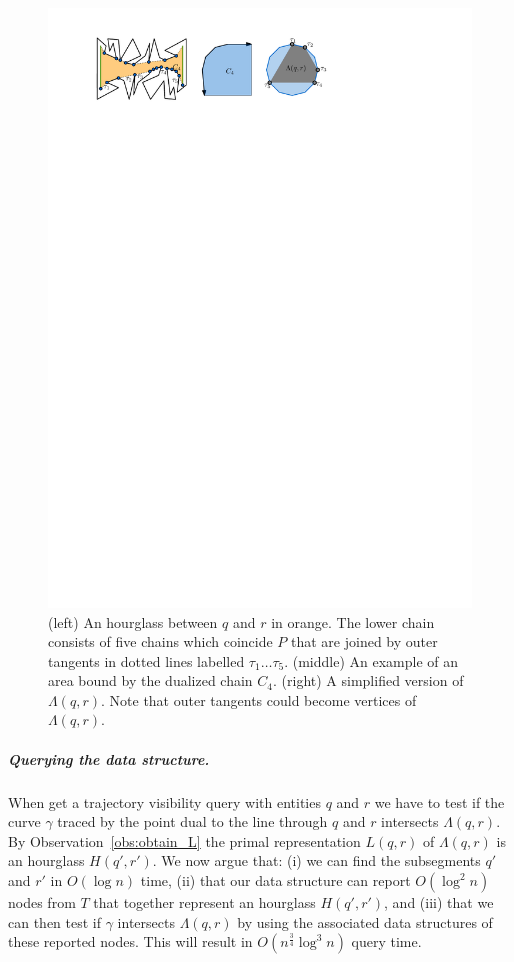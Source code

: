 \documentclass[UKenglish]{lipics-v2019}
\newcommand{\myremark}[4]{\textcolor{blue}{\textsc{#1 #2:}} \textcolor{#4}{\textsf{#3}}}
\newcommand{\frank}[2][says]{\myremark{Frank}{#1}{#2}{SeaGreen}}
\renewcommand{\myremark}[4]{}
\begin{document}
\begin{figure}[tb]
    \centering
    \includegraphics[]{../chain}
    \caption{(left) An hourglass between $q$ and $r$ in orange. The
      lower chain consists of five chains which coincide $P$ that are
      joined by outer tangents in dotted lines labelled $\tau_1 \ldots
      \tau_5$. (middle) An example of an area bound by the dualized
      chain $C_4$. (right) A simplified version of
      $\Lambda(q,r)$. Note that outer tangents could become vertices
      of $\Lambda(q,r)$. \frank{Fig left does not look like an
        hourglass to me; the chains are not semi-convex}}
    \label{fig:chain}
\end{figure}


\subparagraph{Querying the data structure.} When get a trajectory visibility
query with entities $q$ and $r$ we have to test if the curve $\gamma$ traced by
the point dual to the line through $q$ and $r$ intersects $\Lambda(q,r)$.
By Observation~\ref{obs:obtain_L} the primal
representation $L(q,r)$ of $\Lambda(q,r)$ is an hourglass $H(q',r')$. We now
argue that: (i) we can find the subsegments $q'$ and $r'$ in $O(\log n)$ time,
(ii) that our data structure can report $O(\log^2 n)$ nodes from $T$ that
together represent an hourglass $H(q',r')$, and (iii) that we can then test if
$\gamma$ intersects $\Lambda(q,r)$ by using the associated data structures of
these reported nodes. This will result in $O(n^{\frac{3}{4}}\log^3 n)$ query
time.
\end{document}
